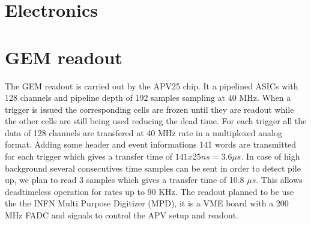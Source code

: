 \documentclass{article}
\begin{document}
\section{Electronics}
\section{GEM readout}
The GEM readout is carried out by the APV25 chip. It a pipelined ASICs with 128 channels and pipeline depth of 192 samples sampling at 40 MHz. When a trigger is issued the corresponding cells are frozen until they are readout while the other cells are still being used reducing the dead time.
For each trigger all the data of 128 channels are transfered at 40 MHz rate in a multiplexed analog format. Adding some header and event informations 141 words are transmitted for each trigger which gives a transfer time of $141x25 ns = 3.6 \mu s $. In case of high background several consecutives time samples can be sent in order to detect pile up, we plan to read 3 samples which gives a transfer time of 10.8 $\mu s$. This allows deadtimeless operation for rates up to 90 KHz. The readout planned to be use the the INFN Multi Purpose Digitizer (MPD), it is a VME board with a 200 MHz FADC and signals to control the APV setup and readout. 
\end{document}
